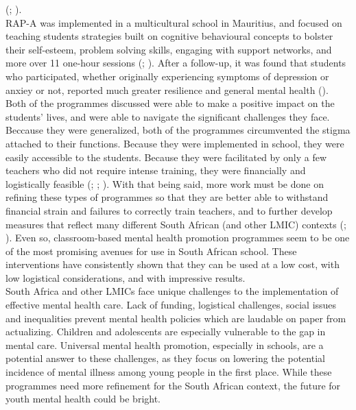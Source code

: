 \documentclass[DIV=calc,fontsize=12bp,a4paper]{scrartcl}
\begin{document}
(\cite{Osetal20b}; \cite{Oseral21}). \\
RAP-A was implemented in a multicultural school in Mauritius, and focused on
teaching students strategies built on cognitive behavioural concepts to bolster
their self-esteem, problem solving skills, engaging with support networks, and
more over 11 one-hour sessions (\cite{barryetal13}; \cite{riduvetal11}). After a
follow-up, it was found that students who participated, whether originally
experiencing symptoms of depression or anxiey or not, reported much greater
resilience and general mental health (\cite{riduvetal11}). \\
Both of the programmes discussed were able to make a positive impact on the
students' lives, and were able to navigate the significant challenges they face.
Beccause they were generalized, both of the programmes circumvented the stigma
attached to their functions. Because they were implemented in school, they were
easily accessible to the students. Because they were facilitated by only a few
teachers who did not require intense training, they were financially and
logistically feasible (\cite{Osetal20b}; \cite{Oseral21}; \cite{riduvetal11}).
With that being said, more work must be done on refining these types of
programmes so that they are better able to withstand financial strain and
failures to correctly train teachers, and to further develop measures that
reflect many different South African (and other LMIC) contexts
(\cite{barryetal13}; \cite{oretal18}). Even so, classroom-based mental health
promotion programmes seem to be one of the most promising avenues for use in
South African school. These interventions have consistently shown that they can
be used at a low cost, with low logistical considerations, and with impressive
results. \\
South Africa and other LMICs face unique challenges to the implementation of
effective mental health care. Lack of funding, logistical challenges, social
issues and inequalities prevent mental health policies which are laudable on
paper from actualizing. Children and adolescents are especially vulnerable to
the gap in mental care. Universal mental health promotion, especially in
schools, are a potential answer to these challenges, as they focus on lowering
the potential incidence of mental illness among young people in the first place.
While these programmes need more refinement for the South African context, the
future for youth mental health could be bright.
   \newpage
   \printbibliography
\end{document}
